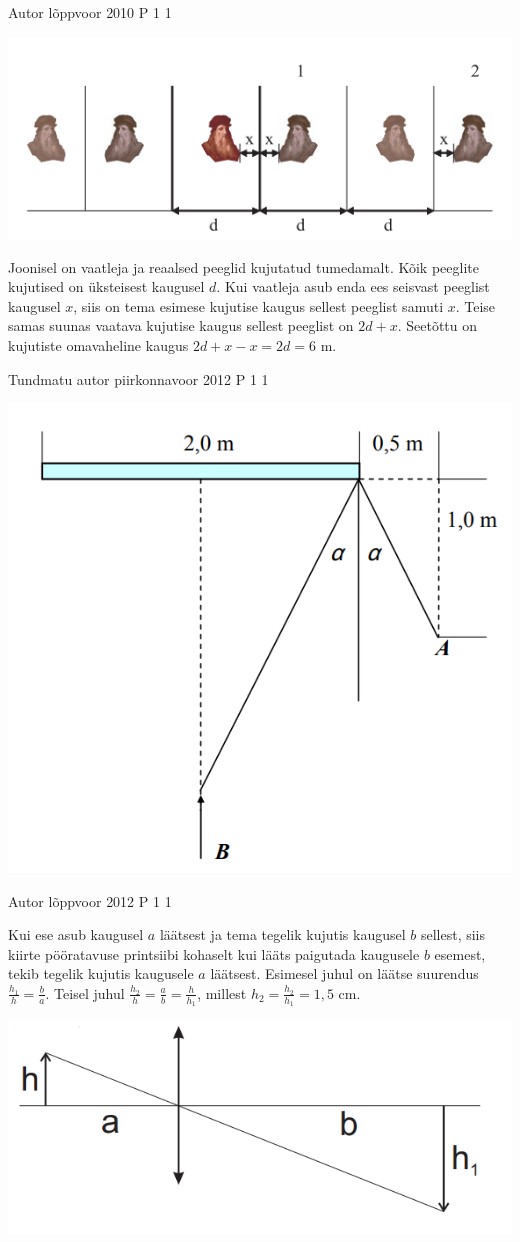 \documentclass[11pt]{article}
\begin{document}
{%
{Autor} %
{lõppvoor} %
{2010} %
{P 1} %
{1} %
{

\ifSolution
\begin{center}
	\includegraphics[width=0.5\linewidth]{2010-v3p-01-lah.PNG}
\end{center}
Joonisel on vaatleja ja reaalsed peeglid kujutatud tumedamalt. Kõik peeglite kujutised on üksteisest kaugusel $d$. Kui vaatleja asub enda ees seisvast peeglist kaugusel $x$, siis on tema esimese kujutise kaugus sellest peeglist samuti $x$. Teise samas suunas vaatava kujutise kaugus sellest peeglist on $2d + x$. Seetõttu on kujutiste omavaheline kaugus $2d + x - x = 2d = 6$ m.
\fi
}


{Tundmatu autor} %
{piirkonnavoor} %
{2012} %
{P 1} %
{1} %
{

\ifSolution
\begin{center}
	\includegraphics[width=0.5\linewidth]{2012-v2p-01-lah.PNG}
\end{center}
\fi
}


{Autor} %
{lõppvoor} %
{2012} %
{P 1} %
{1} %
{

\ifSolution
Kui ese asub kaugusel $a$ läätsest ja tema tegelik kujutis kaugusel $b$ sellest, siis kiirte pööratavuse printsiibi kohaselt kui lääts paigutada kaugusele $b$ esemest, tekib tegelik kujutis kaugusele $a$ läätsest. Esimesel juhul on läätse suurendus $\frac{h_1}{h}= \frac{b}{a}$. Teisel juhul $\frac{h_2}{h}= \frac{a}{b} = \frac{h}{h_1}$, millest $h_2 = \frac{h_2}{h_1} = 1,5$ cm.
\begin{center}
	\includegraphics[width=0.5\linewidth]{2012-v3p-01-lah.PNG}
\end{center}
\fi
}

}
\end{document}
